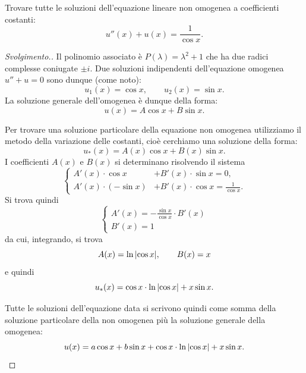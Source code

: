 \begin{exercise}
Trovare tutte le soluzioni dell'equazione lineare non omogenea a coefficienti
costanti:
\[
  u''(x) + u(x) = \frac{1}{\cos x}.    
\]
\end{exercise}
\begin{proof}[Svolgimento.]
Il polinomio associato è $P(\lambda) = \lambda^2 + 1$ che 
ha due radici complesse coniugate $\pm i$.
Due soluzioni indipendenti dell'equazione omogenea $u''+u=0$ sono dunque 
(come noto):
\[
 u_1(x) = \cos x, \qquad u_2(x) = \sin x.
\]
La soluzione generale dell'omogenea è dunque della forma:
\[
  u(x) = A \cos x + B \sin x.  
\]

Per trovare una soluzione particolare della equazione non omogenea 
utilizziamo il metodo della variazione delle costanti, cioè
cerchiamo una soluzione della forma:
\[
  u_*(x) = A(x) \cos x + B(x) \sin x.
\]
I coefficienti $A(x)$ e $B(x)$ si determinano risolvendo il sistema 
\[
\begin{cases}
  A'(x) \cdot \cos x &+ B'(x)\cdot \sin x = 0, \\
  A'(x) \cdot (-\sin x) &+ B'(x)\cdot \cos x = \frac{1}{\cos x}.
\end{cases}  
\]
Si trova quindi 
\[
 \begin{cases}
  A'(x) = -\frac{\sin x}{\cos x} \cdot B'(x) \\
  B'(x) = 1
 \end{cases}  
\]
da cui, integrando, si trova
\[
  A(x) = \ln{\left|\cos x\right|}, \qquad B(x) = x
\]
e quindi 
\[
 u_*(x) = \cos x\cdot \ln {\left|\cos x \right|} + x\sin x.  
\]

Tutte le soluzioni dell'equazione data si scrivono quindi come somma della 
soluzione particolare della non omogenea più la soluzione generale della 
omogenea:
\[
 u(x) = a \cos x + b \sin x + \cos x \cdot \ln {\left|\cos x\right|} + x \sin x.  
\]
\end{proof}

